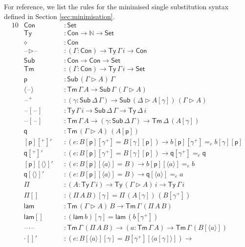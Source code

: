 \documentclass[a4paper,UKenglish]{article}
\newcommand{\ra}{\rightarrow}
\newcommand{\Set}{\mathsf{Set}}
\newcommand{\Ty}{\mathsf{Ty}}
\newcommand{\Tm}{\mathsf{Tm}}
\newcommand{\Con}{\mathsf{Con}}
\newcommand{\Sub}{\mathsf{Sub}}
\newcommand{\p}{\mathsf{p}}
\newcommand{\q}{\mathsf{q}}
\newcommand{\ext}{\mathop{\triangleright}}
\newcommand{\N}{\mathbb{N}}
\newcommand{\lam}{\mathsf{lam}}
\newcommand{\blank}{\mathord{\hspace{1pt}\text{--}\hspace{1pt}}} %
\begin{document}
For reference, we list the rules for the minimised single substitution
syntax defined in Section \ref{sec:minimisation}.
\begin{alignat*}{10}
  & \Con && : \Set \\
  & \Ty && : \Con\ra\N\ra\Set \\
  & \diamond && : \Con \\
  & \blank\ext\blank && : (\Gamma:\Con)\ra\Ty\,\Gamma\,i\ra\Con \\
  & \Sub && : \Con\ra\Con\ra\Set \\
  & \Tm && : (\Gamma:\Con)\ra\Ty\,\Gamma\,i\ra\Set \\
  & \p && : \Sub\,(\Gamma\ext A)\,\Gamma \\
  & \langle\blank\rangle && : \Tm\,\Gamma\,A\ra\Sub\,\Gamma\,(\Gamma\ext A) \\
  & \blank^+ && : (\gamma:\Sub\,\Delta\,\Gamma)\ra\Sub\,(\Delta\ext A[\gamma])\,(\Gamma\ext A) \\
  & \blank[\blank] && : \Ty\,\Gamma\,i\ra\Sub\,\Delta\,\Gamma\ra\Ty\,\Delta\,i \\
  & \blank[\blank] && : \Tm\,\Gamma\,A\ra(\gamma:\Sub\,\Delta\,\Gamma)\ra\Tm\,\Delta\,(A[\gamma]) \\
  & \q && : \Tm\,(\Gamma\ext A)\,(A[\p]) \\
  & [\p][^+]' && : (e:B[\p][\gamma^+] = B[\gamma][\p])\ra b[\p][\gamma^+] =_e b[\gamma][\p] \\
  & \q[^+]' && : (e:B[\p][\gamma^+] = B[\gamma][\p])\ra \q[\gamma^+] =_e \q \\
  & [\p][\langle\rangle]' && : (e:B[\p][\langle a\rangle] = B)\ra b[\p ][\langle a\rangle] =_e b \\
  & \q[\langle\rangle]' && : (e:B[\p][\langle a\rangle] = B)\ra \q[\langle a\rangle] =_e a \\
  & \Pi && : (A:\Ty\,\Gamma\,i)\ra\Ty\,(\Gamma\ext A)\,i\ra\Ty\,\Gamma\,i \\
  & \Pi[] && : (\Pi\,A\,B)[\gamma] = \Pi\,(A[\gamma])\,(B[\gamma^+]) \\
  & \lam && : \Tm\,(\Gamma\ext A)\,B\ra\Tm\,\Gamma\,(\Pi\,A\,B) \\
  & \lam[] && : (\lam\,b)[\gamma] = \lam\,(b[\gamma^+]) \\
  & \blank\cdot\blank && : \Tm\,\Gamma\,(\Pi\,A\,B)\ra(a:\Tm\,\Gamma\,A)\ra\Tm\,\Gamma\,(B[\langle a\rangle]) \\
  & {\cdot}[]' && : (e:B[\langle a\rangle][\gamma] = B[\gamma^+][\langle a[\gamma]\rangle])\ra \\

\end{alignat*}
\end{document}
